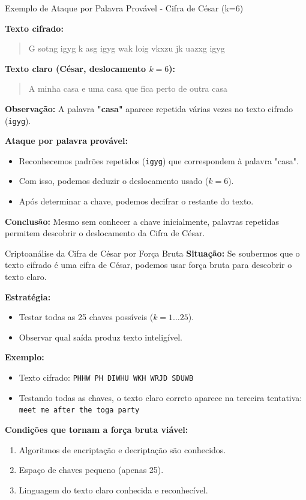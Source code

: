 \begin{frame}{Exemplo de Ataque por Palavra Provável - Cifra de César (k=6)}

\textbf{Texto cifrado:}  
\begin{quote}
G sotng igyg k asg igyg wak loig vkxzu jk uazxg igyg
\end{quote}

\textbf{Texto claro  (César, deslocamento $k=6$):}  
\begin{quote}
A minha casa e uma casa que fica perto de outra casa
\end{quote}



\medskip
\textbf{Observação:}  
A palavra \textbf{"casa"} aparece repetida várias vezes no texto cifrado (\texttt{igyg}).

\medskip
\textbf{Ataque por palavra provável:}  
\begin{itemize}
    \item Reconhecemos padrões repetidos (\texttt{igyg}) que correspondem à palavra "casa".  
    \item Com isso, podemos deduzir o deslocamento usado ($k=6$).  
    \item Após determinar a chave, podemos decifrar o restante do texto.
\end{itemize}

\textbf{Conclusão:}  
Mesmo sem conhecer a chave inicialmente, palavras repetidas permitem descobrir o deslocamento da Cifra de César.
\end{frame}

\begin{frame}{Criptoanálise da Cifra de César por Força Bruta}
\textbf{Situação:}  
Se soubermos que o texto cifrado é uma cifra de César, podemos usar força bruta para descobrir o texto claro.

\medskip
\textbf{Estratégia:}  
\begin{itemize}
    \item Testar todas as 25 chaves possíveis (\(k = 1 \dots 25\)).  
    \item Observar qual saída produz texto inteligível.  
\end{itemize}

\medskip
\textbf{Exemplo:}  
\begin{itemize}
    \item Texto cifrado: \texttt{PHHW PH DIWHU WKH WRJD SDUWB}  
    \item Testando todas as chaves, o texto claro correto aparece na terceira tentativa: \texttt{meet me after the toga party}
\end{itemize}

\medskip
\textbf{Condições que tornam a força bruta viável:}  
\begin{enumerate}
    \item Algoritmos de encriptação e decriptação são conhecidos.  
    \item Espaço de chaves pequeno (apenas 25).  
    \item Linguagem do texto claro conhecida e reconhecível.
\end{enumerate}
\end{frame}


